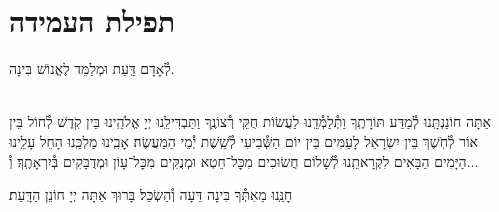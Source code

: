 \documentclass[twoside, openany, parskip=half, 11pt]{book}
\begin{document}
\section*{ תפילת העמידה }


\amidaopening{\ayt}{}

לְ֯אָדָם דַּֽעַת וּמְלַמֵּד לֶאֱנוֹשׁ בִּינָה.

\begin{sometimes}

\\
אַתָּה חוֹנַנְתָּֽנוּ לְ֯מַדַּע תּוֹרָתֶֽךָ וַתְּ֯לַמְּ֯דֵֽנוּ לַעֲשׂוֹת חֻקֵּי רְ֯צוֹנֶֽךָ וַתַּבְדִּילֵֽנוּ יְיָ אֱלֹהֵֽינוּ בֵּין קֹֽדֶשׁ לְ֯חוֹל בֵּין אוֹר לְ֯חֹֽשֶׁךְ בֵּין יִשְׂרָאֵל לָעַמִּים בֵּין יוֹם הַשְּׁ֯בִיעִי לְ֯שֵֽׁשֶׁת יְ֯מֵי הַמַּעֲשֶׂה׃ אָבִֽינוּ מַלְכֵּֽנוּ הָחֵל עָלֵֽינוּ הַיָּמִים הַבָּאִים לִקְרָאתֵֽנוּ לְ֯שָׁלוֹם חֲשׂוּכִים מִכׇּל־חֵטְא וּמְנֻקִּים מִכׇּל־עָוֹן וּמְדֻבָּקִים בְּ֯יִרְאָתֶֽךָ׃ וְ֯...

\end{sometimes}

חׇנֵּֽנוּ מֵאִתְּ֯ךָ בִּינָה דֵּעָה וְ֯הַשְׂכֵּל׃ בָּרוּךְ אַתָּה יְיָ חוֹנֵן הַדָּֽעַת׃

\weekdaysateshuva

\weekdaysaselichah

\weekdaysageulah

\weekdaysarefuah

\weekdaysaberacha

\weekdaysashofar

\weekdaysamishpat

\weekdaysaminim

\weekdaysatzadikim

\weekdaysayerushelayim

\weekdaysamalchus

\weekdaysashemakoleinu

\retzeh

\yaalehveyavo

\zion

\newcommand{\maarivmodim}{
\firstword{מוֹדִים}
אֲנַֽחְנוּ לָךְ שָׁאַתָּה הוּא יְיָ אֱלֹהֵֽינוּ וֵאלֹהֵי אֲבוֹתֵֽינוּ לְ֯עוֹלָם וָעֶד צוּר חַיֵּֽינוּ מָגֵן יִשְׁעֵֽנוּ אַתָּה הוּא לְ֯דוֹר וָדוֹר׃ נוֹדֶה לְּ֯ךָ וּנְסַפֵּר תְּ֯הִלָּתֶֽךָ עַל חַיֵּֽינוּ הַמְּ֯סוּרִים בְּ֯יָדֶֽךָ וְ֯עַל נִשְׁמוֹתֵֽינוּ הַפְּ֯קוּדוֹת לָךְ וְ֯עַל נִסֶּֽיךָ שֶׁבְּ֯כׇל־יוֹם עִמָּֽנוּ וְ֯עַל נִפְלְ֯אוֹתֶֽיךָ וְ֯טוֹבוֹתֶֽיךָ שֶׁבְּ֯כׇל־עֵת עֶֽרֶב וָבֹֽקֶר וְ֯צׇהֳרָֽיִם׃ הַטּוֹב כִּי לֹא כָלוּ רַחֲמֶֽיךָ וְ֯הַמְ֯רַחֵם כִּי לֹא תַֽמּוּ חֲסָדֶֽיךָ מֵעוֹלָם קִוִֽינוּ לָךְ׃
}
\end{document}
